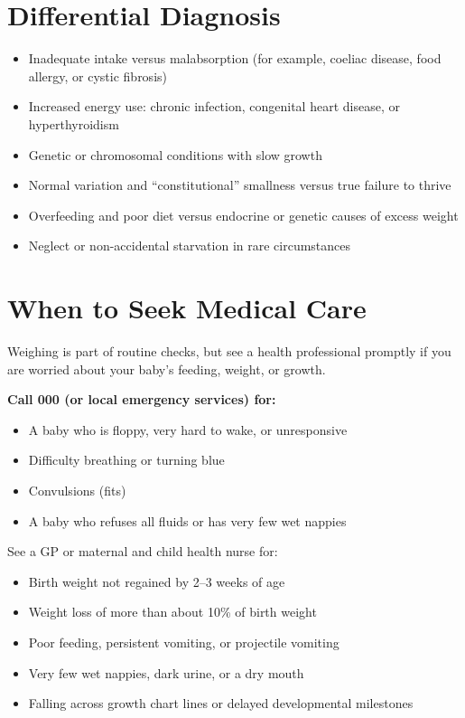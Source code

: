 \section*{Differential Diagnosis}
\begin{itemize}
    \item Inadequate intake versus malabsorption (for example, coeliac disease, food allergy, or cystic fibrosis)
    \item Increased energy use: chronic infection, congenital heart disease, or hyperthyroidism
    \item Genetic or chromosomal conditions with slow growth
    \item Normal variation and ``constitutional'' smallness versus true failure to thrive
    \item Overfeeding and poor diet versus endocrine or genetic causes of excess weight
    \item Neglect or non-accidental starvation in rare circumstances
\end{itemize}

\section*{When to Seek Medical Care}
Weighing is part of routine checks, but see a health professional promptly if you are worried about your baby's feeding, weight, or growth.

\textbf{Call 000 (or local emergency services) for:}
\begin{itemize}
    \item A baby who is floppy, very hard to wake, or unresponsive
    \item Difficulty breathing or turning blue
    \item Convulsions (fits)
    \item A baby who refuses all fluids or has very few wet nappies
\end{itemize}

See a GP or maternal and child health nurse for:
\begin{itemize}
    \item Birth weight not regained by 2--3 weeks of age
    \item Weight loss of more than about 10\% of birth weight
    \item Poor feeding, persistent vomiting, or projectile vomiting
    \item Very few wet nappies, dark urine, or a dry mouth
    \item Falling across growth chart lines or delayed developmental milestones
\end{itemize}

